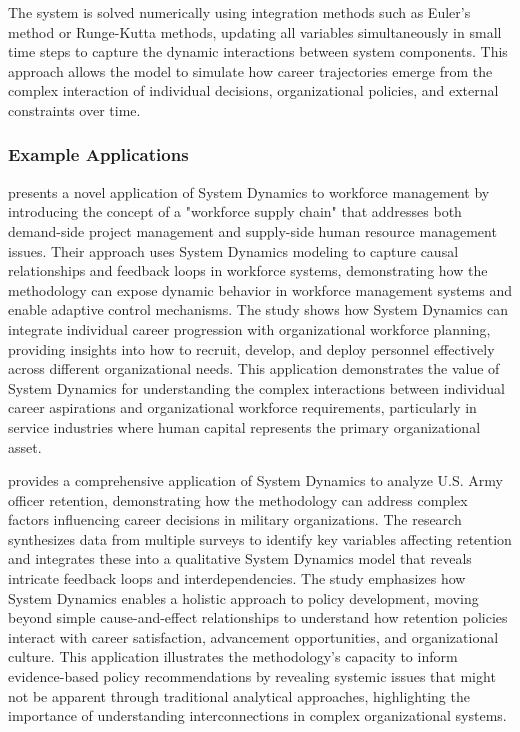 \documentclass[main.tex]{subfiles}
\begin{document}
The system is solved numerically using integration methods such as Euler's method or Runge-Kutta methods, updating all variables simultaneously in small time steps to capture the dynamic interactions between system components\parencite{sd_wikipedia}. This approach allows the model to simulate how career trajectories emerge from the complex interaction of individual decisions, organizational policies, and external constraints over time.

\subsubsection{Example Applications}


\textcite{ibm_workforce} presents a novel application of System Dynamics to workforce management by introducing the concept of a "workforce supply chain" that addresses both demand-side project management and supply-side human resource management issues. Their approach uses System Dynamics modeling to capture causal relationships and feedback loops in workforce systems, demonstrating how the methodology can expose dynamic behavior in workforce management systems and enable adaptive control mechanisms. The study shows how System Dynamics can integrate individual career progression with organizational workforce planning, providing insights into how to recruit, develop, and deploy personnel effectively across different organizational needs. This application demonstrates the value of System Dynamics for understanding the complex interactions between individual career aspirations and organizational workforce requirements, particularly in service industries where human capital represents the primary organizational asset.


\textcite{dulce_thesis} provides a comprehensive application of System Dynamics to analyze U.S. Army officer retention, demonstrating how the methodology can address complex factors influencing career decisions in military organizations. The research synthesizes data from multiple surveys to identify key variables affecting retention and integrates these into a qualitative System Dynamics model that reveals intricate feedback loops and interdependencies. The study emphasizes how System Dynamics enables a holistic approach to policy development, moving beyond simple cause-and-effect relationships to understand how retention policies interact with career satisfaction, advancement opportunities, and organizational culture. This application illustrates the methodology's capacity to inform evidence-based policy recommendations by revealing systemic issues that might not be apparent through traditional analytical approaches, highlighting the importance of understanding interconnections in complex organizational systems.
\end{document}
